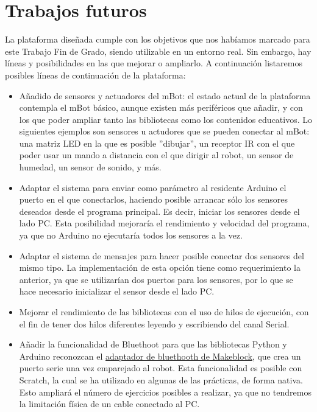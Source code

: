 \section{Trabajos futuros}
La plataforma diseñada cumple con los objetivos que nos habíamos marcado para este Trabajo Fin de Grado, siendo utilizable en un entorno real. Sin embargo, hay líneas y posibilidades en las que mejorar o ampliarlo. A continuación listaremos posibles líneas de continuación de la plataforma:
\begin{itemize}
	\item Añadido de sensores y actuadores del mBot: el estado actual de la plataforma contempla el mBot básico, aunque existen más periféricos que añadir, y con los que poder ampliar tanto las bibliotecas como los contenidos educativos. Lo siguientes ejemplos son sensores u actudores que se pueden conectar al mBot: una matriz LED en la que es posible ''dibujar'', un receptor IR con el que poder usar un mando a distancia con el que dirigir al robot, un sensor de humedad, un sensor de sonido, y más.
	\item Adaptar el sistema para enviar como parámetro al residente Arduino el puerto en el que conectarlos, haciendo posible arrancar sólo los sensores deseados desde el programa principal. Es decir, iniciar los sensores desde el lado PC. Esta posibilidad mejoraría el rendimiento y velocidad del programa, ya que no Arduino no ejecutaría todos los sensores a la vez.
	\item Adaptar el sistema de mensajes para hacer posible conectar dos sensores del mismo tipo. La implementación de esta opción tiene como requerimiento la anterior, ya que se utilizarían dos puertos para los sensores, por lo que se hace necesario inicializar el sensor desde el lado PC.
	\item Mejorar el rendimiento de las bibliotecas con el uso de hilos de ejecución, con el fin de tener dos hilos diferentes leyendo y escribiendo del canal Serial.
	\item Añadir la funcionalidad de Bluethoot para que las bibliotecas Python y Arduino reconozcan el \href{https://www.makeblock.es/productos/adaptador_bluetooth_usb/}{adaptador de bluethooth de Makeblock}, que crea un puerto serie una vez emparejado al robot. Esta funcionalidad es posible con Scratch, la cual se ha utilizado en algunas de las prácticas, de forma nativa. Esto ampliará el número de ejercicios posibles a realizar, ya que no tendremos la limitación física de un cable conectado al PC.
\end{itemize} 
